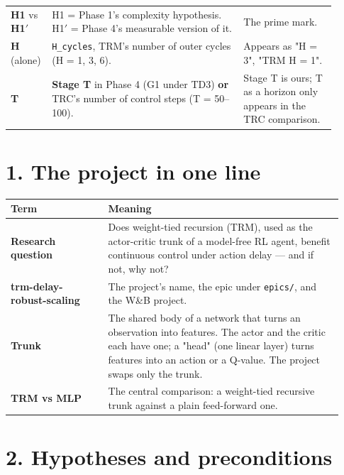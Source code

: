 \documentclass[11pt]{article}
\begin{document}
\begin{center}
\begin{tabular}{>{\raggedright\arraybackslash}p{0.069\linewidth}>{\raggedright\arraybackslash}p{0.563\linewidth}>{\raggedright\arraybackslash}p{0.274\linewidth}}
\textbf{H1} vs \textbf{H1$'$} & H1 = Phase 1's complexity hypothesis. H1$'$ = Phase 4's measurable version of it. & The prime mark. \\
\textbf{H} (alone) & \texttt{H\_cycles}, TRM's number of outer cycles (H = 1, 3, 6). & Appears as "H = 3", "TRM H = 1". \\
\textbf{T} & \textbf{Stage T} in Phase 4 (G1 under TD3) \textbf{or} TRC's number of control steps (T = 50--100). & Stage T is ours; T as a horizon only appears in the TRC comparison. \\
\bottomrule
\end{tabular}\end{center}



\medskip



\section*{1. The project in one line}



\begin{center}\small\begin{tabular}{>{\raggedright\arraybackslash}p{0.276\linewidth}>{\raggedright\arraybackslash}p{0.658\linewidth}}
\toprule
Term & Meaning \\
\midrule
\textbf{Research question} & Does weight-tied recursion (TRM), used as the actor-critic trunk of a model-free RL agent, benefit continuous control under action delay --- and if not, why not? \\
\textbf{trm-delay-robust-scaling} & The project's name, the epic under \texttt{epics/}, and the W\&B project. \\
\textbf{Trunk} & The shared body of a network that turns an observation into features. The actor and the critic each have one; a "head" (one linear layer) turns features into an action or a Q-value. The project swaps only the trunk. \\
\textbf{TRM vs MLP} & The central comparison: a weight-tied recursive trunk against a plain feed-forward one. \\
\bottomrule
\end{tabular}\end{center}



\section*{2. Hypotheses and preconditions}
\end{document}
